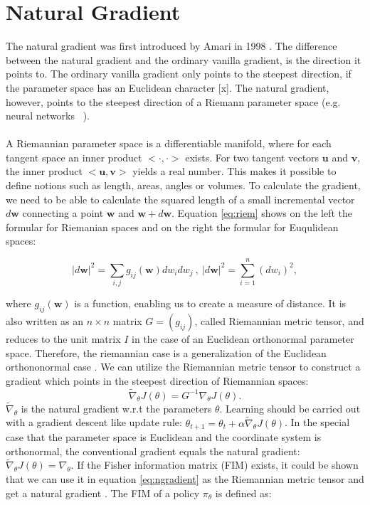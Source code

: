 \section{Natural Gradient}
\label{sec:NG}
\citep{amari1987differential}
The natural gradient was first introduced by Amari in 1998 \cite{amari1998natural}. The difference between the natural gradient and the ordinary vanilla gradient, is the direction it points to. The ordinary vanilla gradient only points to the steepest direction, if the parameter space has an Euclidean character [x]. The natural gradient, however, points to the steepest direction of a Riemann parameter space (e.g. neural networks  \citep{amari1998natural}).
\\\\
A Riemannian parameter space is a differentiable manifold, where for each tangent space an inner product $<\cdot , \cdot >$ exists. For two tangent vectors $\mathbf{u}$ and $\mathbf{v}$, the inner product $<\mathbf{u}, \mathbf{v}>$ yields a real number. This makes it possible to define notions such as length, areas, angles or volumes. To calculate the gradient, we need to be able to calculate the squared length of a small incremental vector $d\textbf{w}$ connecting a point $\textbf{w}$ and $\textbf{w} + d\textbf{w}$. Equation \ref{eq:riem} shows on the left the formular for Riemanian spaces and on the right the formular for Euqulidean spaces:

\begin{equation}
	\label{eq:riem}
	|d\textbf{w}|^2 = \sum_{i,j}g_{ij}(\textbf{w}) dw_i dw_j ~,~ |d\textbf{w}|^2 = \sum_{i=1}^{n}(dw_i)^2,
\end{equation}

where $g_{ij}(\textbf{w})$ is a function, enabling us to create a measure of distance. It is also written as an $n \times n$ matrix $G = (g_{ij})$, called Riemannian metric tensor, and reduces to the unit matrix $I$ in the case of an Euclidean orthonormal parameter space. Therefore, the riemannian case is a generalization of the Euclidean orthononormal case \citep{haykin2009neural, amari1998natural}. We can utilize the Riemannian metric tensor to construct a gradient which points in the steepest direction of Riemannian spaces:
\begin{equation}
	\label{eq:ngradient}
	\widetilde{\nabla}_{\theta} J(\theta) = G^{-1} \nabla_\theta J(\theta).
\end{equation}
$\widetilde{\nabla}_{\theta}$ is the natural gradient w.r.t the parameters $\theta$.  Learning should be carried out with a gradient descent like update rule: $\theta_{t+1} = \theta_{t} + \alpha \widetilde{\nabla}_{\theta} J(\theta)$. In the special case that the parameter space is Euclidean and the coordinate system is orthonormal, the conventional gradient equals the natural gradient: $\widetilde{\nabla}_{\theta} J(\theta) = \nabla_{\theta}$.
If the Fisher information matrix (FIM) exists, it could be shown that we can use it in equation \ref{eq:ngradient} as the Riemannian metric tensor and get a natural gradient \citep{peters2008natural, amari1998efficiently}. The FIM of a policy $\pi_{\theta}$ is defined as:

